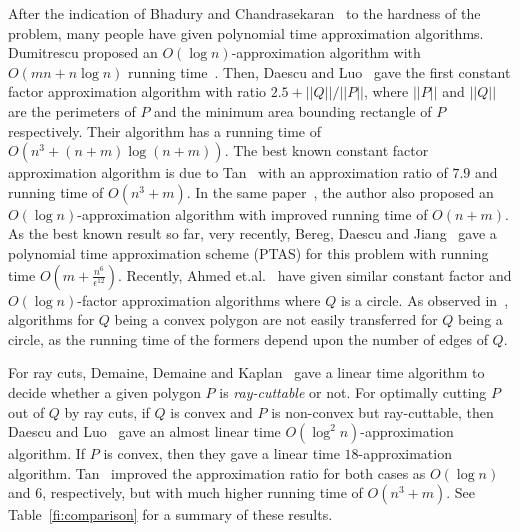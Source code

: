 \documentclass{llncs}
\begin{document}
After the indication of Bhadury and Chandrasekaran~\cite{ab} to
the hardness of the problem, many people have given polynomial time approximation algorithms.
Dumitrescu proposed an $O(\log n)$-approximation algorithm with
$O(mn+n\log n)$ running time~\cite{ae,ad}. Then, Daescu and
Luo~\cite{af} gave the first constant factor approximation
algorithm with ratio $2.5+||Q||/||P||$,
where $||P||$ and $||Q||$ are the perimeters of $P$ and the minimum area bounding rectangle of $P$ respectively.
Their algorithm has a running time of
$O(n^{3}+(n+m)\log{(n+m)})$. The best known constant factor
approximation algorithm is due to Tan~\cite{ac} with an approximation ratio of
$7.9$ and running time of $O(n^{3}+m)$. In the same
paper~\cite{ac}, the author also proposed an $O(\log n)$-approximation
algorithm with improved running time of $O(n+m)$.
As the best known result so far, very recently, Bereg, Daescu and
Jiang~\cite{ah} gave a polynomial time approximation scheme (PTAS)
for this problem with running time $O(m+\frac{n^{6}}{\epsilon^{12}})$.
Recently, Ahmed et.al.~\cite{AIH} have given similar constant factor and $O(\log n)$-factor
approximation algorithms where $Q$ is a circle. 
As observed in~\cite{AIH}, algorithms for $Q$ being a convex polygon are not
easily transferred for $Q$ being a circle, as the running time of the
formers depend upon the number of edges of $Q$.


For ray cuts, Demaine, Demaine and Kaplan~\cite{ag} gave a linear time algorithm to decide
whether a given polygon $P$ is \emph{ray-cuttable} or not.
For optimally cutting $P$ out of $Q$ by ray cuts, 
if $Q$ is convex and $P$ is non-convex but ray-cuttable, 
then Daescu and Luo~\cite{af} gave an almost linear time
$O(\log^2n)$-approximation algorithm.
If $P$ is convex, then they gave a linear time $18$-approximation algorithm.
Tan~\cite{ac} improved the approximation ratio for both cases
as $O(\log n)$ and $6$, respectively, but with much higher running time of $O(n^3+m)$.
See Table~\ref{fi:comparison} for a summary of these results.
\end{document}
